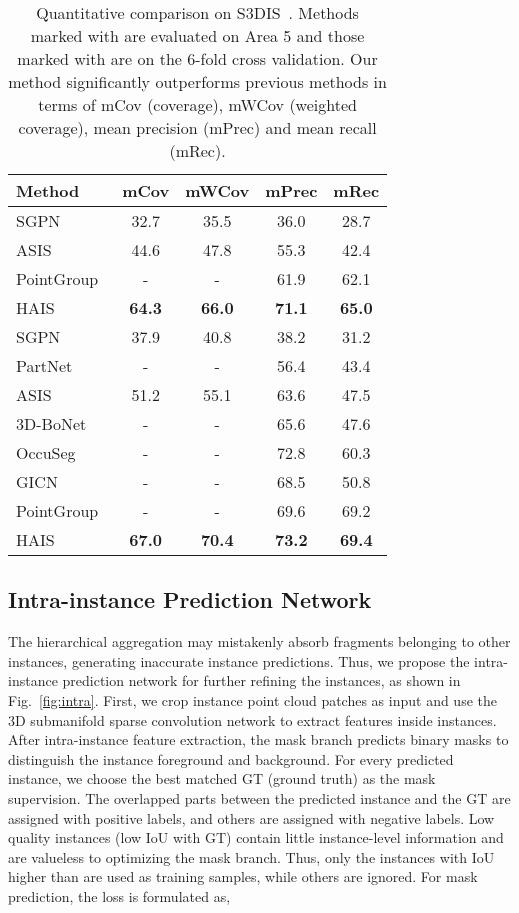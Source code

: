 \documentclass[10pt,twocolumn,letterpaper]{article}
\newcommand{\thename}{HAIS}
\begin{document}
\begin{table}[]
    \centering
    \begin{tabular}{lcccc}
    \toprule
     Method  & mCov &  mWCov & mPrec & mRec\\
    \midrule
    SGPN~\cite{SGPN}& 32.7 & 35.5 & 36.0 & 28.7\\
    ASIS~\cite{ASIS}& 44.6 & 47.8 & 55.3 & 42.4\\
    PointGroup~\cite{PointGroup} & - & - & 61.9 & 62.1\\
    \thename & \textbf{64.3} & \textbf{66.0} & \textbf{71.1} & \textbf{65.0} \\
    \toprule
    SGPN~\cite{SGPN}& 37.9 & 40.8  & 38.2 & 31.2\\
    PartNet~\cite{PartNet} & - & - & 56.4 & 43.4\\
    ASIS~\cite{ASIS}& 51.2 & 55.1 & 63.6 & 47.5\\
    3D-BoNet~\cite{BoNet}& - & - & 65.6 & 47.6\\
    OccuSeg~\cite{OccuSeg}& - & - & 72.8 & 60.3\\
    GICN~\cite{GICN} & - & - & 68.5 & 50.8\\
    PointGroup~\cite{PointGroup} & - & - & 69.6 & 69.2\\
    \thename & \textbf{67.0} & \textbf{70.4} & \textbf{73.2} & \textbf{69.4} \\
    \bottomrule
    \end{tabular}
    \caption{Quantitative comparison on S3DIS~\cite{S3DIS}. Methods marked with  are evaluated on Area 5 and those marked with  are on the 6-fold cross validation. Our method significantly outperforms previous methods in terms of mCov (coverage), mWCov (weighted coverage), mean precision (mPrec) and mean recall (mRec).}
    \label{tab:main_result_S3DIS}
\end{table}






\subsection{Intra-instance Prediction Network}
\label{sec:intra}
The hierarchical aggregation may mistakenly absorb fragments belonging to other instances, generating inaccurate instance predictions.
Thus, we propose the intra-instance prediction network for further refining the instances, as shown in Fig.~\ref{fig:intra}. First, we crop instance point cloud patches as input and use the 3D submanifold sparse convolution network to extract features inside instances. 
After intra-instance feature extraction, the mask branch predicts binary masks to distinguish the instance foreground and background.
For every predicted instance, we choose the best matched GT (ground truth) as the mask supervision. The overlapped parts between the predicted instance and the GT are assigned with positive labels, and others are assigned with negative labels. 
Low quality instances (low IoU with GT) contain little instance-level information and are valueless to optimizing the mask branch. 
Thus, only the instances with IoU higher than  are used as training samples, while others are ignored. 
For mask prediction, the loss is formulated as,
\end{document}
